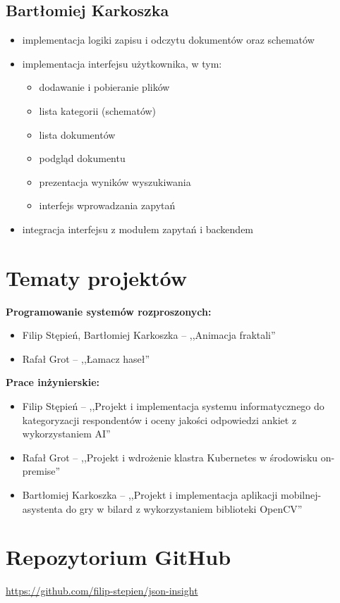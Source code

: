 \documentclass[a4paper,12pt]{article}
\begin{document}
\subsection*{Bartłomiej Karkoszka}

\begin{itemize}
  \item implementacja logiki zapisu i odczytu dokumentów oraz schematów
  \item implementacja interfejsu użytkownika, w tym:
        \begin{itemize}
          \item dodawanie i pobieranie plików
          \item lista kategorii (schematów)
          \item lista dokumentów
          \item podgląd dokumentu
          \item prezentacja wyników wyszukiwania
          \item interfejs wprowadzania zapytań
        \end{itemize}
  \item integracja interfejsu z modułem zapytań i backendem
\end{itemize}

\section{Tematy projektów}

\textbf{Programowanie systemów rozproszonych:}

\begin{itemize}
  \item Filip Stępień, Bartłomiej Karkoszka -- ,,Animacja fraktali''
  \item Rafał Grot -- ,,Łamacz haseł''
\end{itemize}

\textbf{Prace inżynierskie:}

\begin{itemize}
  \item Filip Stępień -- ,,Projekt i implementacja systemu informatycznego do kategoryzacji respondentów i oceny jakości odpowiedzi ankiet z wykorzystaniem AI''
  \item Rafał Grot -- ,,Projekt i wdrożenie klastra Kubernetes w środowisku on-premise''
  \item Bartłomiej Karkoszka -- ,,Projekt i implementacja aplikacji mobilnej-asystenta do gry w bilard z wykorzystaniem biblioteki OpenCV''
\end{itemize}

\section{Repozytorium GitHub}

\url{https://github.com/filip-stepien/json-insight}
\end{document}
